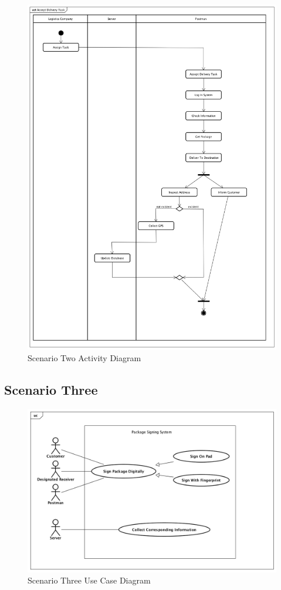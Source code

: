 \documentclass[12pt]{scrreprt}
\begin{document}
\begin{figure}[H]
  \centering\includegraphics[width=6in]{DocumentRes/2ActivityDiagram.png}
  \caption{Scenario Two Activity Diagram}
\end{figure}

\subsection{Scenario Three}
\begin{figure}[H]
  \centering\includegraphics[width=5in]{DocumentRes/3UseCaseDiagram.png}
  \caption{Scenario Three Use Case Diagram}
\end{figure}
\end{document}
